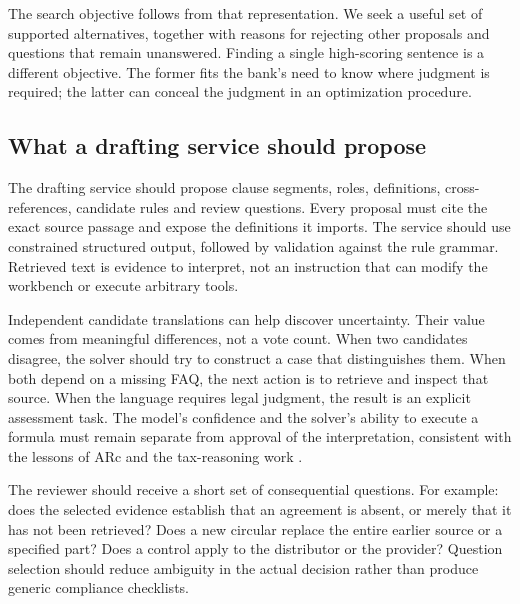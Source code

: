 The search objective follows from that representation. We seek a useful set of
supported alternatives, together with reasons for rejecting other proposals and
questions that remain unanswered. Finding a single high-scoring sentence is a
different objective. The former fits the bank's need to know where judgment is
required; the latter can conceal the judgment in an optimization procedure.

\subsection{What a drafting service should propose}
\label{merge:P-03-product:08}


The drafting service should propose clause segments, roles, definitions,
cross-references, candidate rules and review questions. Every proposal must cite
the exact source passage and expose the definitions it imports. The service
should use constrained structured output, followed by validation against the
rule grammar. Retrieved text is evidence to interpret, not an instruction that
can modify the workbench or execute arbitrary tools.

Independent candidate translations can help discover uncertainty. Their value
comes from meaningful differences, not a vote count. When two candidates disagree,
the solver should try to construct a case that distinguishes them. When both
depend on a missing FAQ, the next action is to retrieve and inspect that source.
When the language requires legal judgment, the result is an explicit assessment
task. The model's confidence and the solver's ability to execute a formula must
remain separate from approval of the interpretation, consistent with the lessons
of ARc and the tax-reasoning work \citep{arc2025,jurayj2026}.


The reviewer should receive a short set of consequential questions. For example:
does the selected evidence establish that an agreement is absent, or merely that
it has not been retrieved? Does a new circular replace the entire earlier source
or a specified part? Does a control apply to the distributor or the provider?
Question selection should reduce ambiguity in the actual decision rather than
produce generic compliance checklists.

